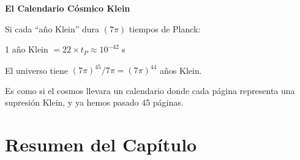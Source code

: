 \begin{analogiabox}
\textbf{El Calendario Cósmico Klein}

Si cada ``año Klein'' dura $(7\pi)$ tiempos de Planck:

1 año Klein $= 22 \times t_P \approx 10^{-42}$ s

El universo tiene $(7\pi)^{45} / 7\pi = (7\pi)^{44}$ años Klein.

Es como si el cosmos llevara un calendario donde cada página
representa una supresión Klein, y ya hemos pasado 45 páginas.
\end{analogiabox}


\section{Resumen del Capítulo}

